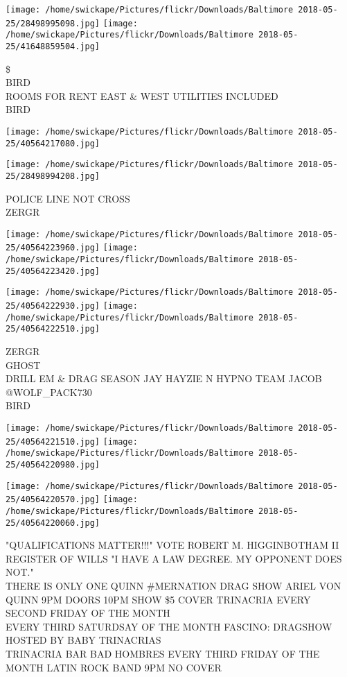 \documentclass[10pt,letterpaper]{article}
\begin{document}
\texttt{[image: /home/swickape/Pictures/flickr/Downloads/Baltimore 2018-05-25/28498995098.jpg]}
\texttt{[image: /home/swickape/Pictures/flickr/Downloads/Baltimore 2018-05-25/41648859504.jpg]}

\$\\
BIRD\\
ROOMS FOR RENT EAST \& WEST UTILITIES INCLUDED\\
BIRD
\pagebreak

\texttt{[image: /home/swickape/Pictures/flickr/Downloads/Baltimore 2018-05-25/40564217080.jpg]}

\vspace{0.25in}
\texttt{[image: /home/swickape/Pictures/flickr/Downloads/Baltimore 2018-05-25/28498994208.jpg]}

POLICE LINE NOT CROSS\\
ZERGR
\pagebreak

\texttt{[image: /home/swickape/Pictures/flickr/Downloads/Baltimore 2018-05-25/40564223960.jpg]}
\texttt{[image: /home/swickape/Pictures/flickr/Downloads/Baltimore 2018-05-25/40564223420.jpg]}

\texttt{[image: /home/swickape/Pictures/flickr/Downloads/Baltimore 2018-05-25/40564222930.jpg]}
\texttt{[image: /home/swickape/Pictures/flickr/Downloads/Baltimore 2018-05-25/40564222510.jpg]}

ZERGR\\
GHOST\\
DRILL EM \& DRAG SEASON JAY HAYZIE N HYPNO TEAM JACOB @WOLF\_PACK730\\
BIRD
\pagebreak

\texttt{[image: /home/swickape/Pictures/flickr/Downloads/Baltimore 2018-05-25/40564221510.jpg]}
\texttt{[image: /home/swickape/Pictures/flickr/Downloads/Baltimore 2018-05-25/40564220980.jpg]}

\texttt{[image: /home/swickape/Pictures/flickr/Downloads/Baltimore 2018-05-25/40564220570.jpg]}
\texttt{[image: /home/swickape/Pictures/flickr/Downloads/Baltimore 2018-05-25/40564220060.jpg]}

"QUALIFICATIONS MATTER!!!" VOTE ROBERT M. HIGGINBOTHAM II REGISTER OF WILLS "I HAVE A LAW DEGREE.  MY OPPONENT DOES NOT."\\
THERE IS ONLY ONE QUINN \#MERNATION DRAG SHOW ARIEL VON QUINN 9PM DOORS 10PM SHOW \$5 COVER TRINACRIA EVERY SECOND FRIDAY OF THE MONTH\\
EVERY THIRD SATURDSAY OF THE MONTH FASCINO: DRAGSHOW HOSTED BY BABY TRINACRIAS\\
TRINACRIA BAR BAD HOMBRES EVERY THIRD FRIDAY OF THE MONTH LATIN ROCK BAND 9PM NO COVER
\pagebreak
\end{document}
